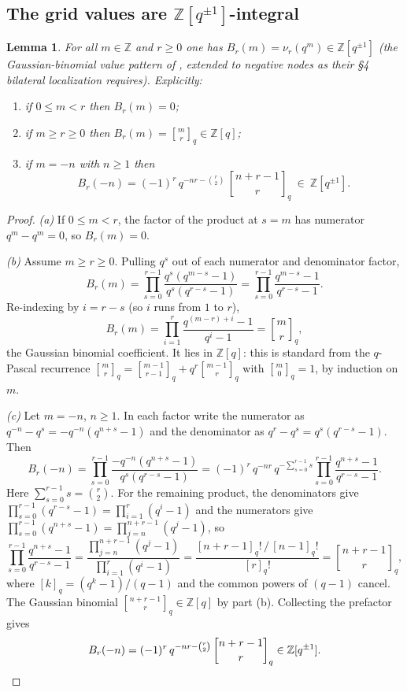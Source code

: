 \documentclass[11pt]{article}
\newtheorem{lemma}{Lemma}
\newcommand{\Z}{\mathbb Z}
\newcommand{\qbinom}[2]{\genfrac{[}{]}{0pt}{}{#1}{#2}_{q}}
\begin{document}
\subsection{The grid values are $\Z[q^{\pm1}]$-integral}

\begin{lemma}\label{lem:grid}
For all $m\in\Z$ and $r\ge0$ one has $B_r(m)=\nu_r(q^{m})\in\Z[q^{\pm1}]$
(the Gaussian-binomial value pattern of \cite[\S1]{HarmanHopkins}, extended
to negative nodes as their \S4 bilateral localization requires).
Explicitly:
\begin{enumerate}
\item[(a)] if $0\le m<r$ then $B_r(m)=0$;
\item[(b)] if $m\ge r\ge0$ then $B_r(m)=\qbinom{m}{r}\in\Z[q]$;
\item[(c)] if $m=-n$ with $n\ge1$ then
  \[
    B_r(-n)=(-1)^{r}\,q^{-nr-\binom{r}{2}}\,\qbinom{n+r-1}{r}\ \in\ \Z[q^{\pm1}].
  \]
\end{enumerate}
\end{lemma}

\begin{proof}
\emph{(a)}\; If $0\le m<r$, the factor of the product at $s=m$ has numerator
$q^{m}-q^{m}=0$, so $B_r(m)=0$.

\emph{(b)}\; Assume $m\ge r\ge0$. Pulling $q^{s}$ out of each numerator and
denominator factor,
\[
  B_r(m)=\prod_{s=0}^{r-1}\frac{q^{s}(q^{m-s}-1)}{q^{s}(q^{r-s}-1)}
        =\prod_{s=0}^{r-1}\frac{q^{m-s}-1}{q^{r-s}-1}.
\]
Re-indexing by $i=r-s$ (so $i$ runs from $1$ to $r$),
\[
  B_r(m)=\prod_{i=1}^{r}\frac{q^{(m-r)+i}-1}{q^{i}-1}=\qbinom{m}{r},
\]
the Gaussian binomial coefficient. It lies in $\Z[q]$: this is standard from the
$q$-Pascal recurrence $\qbinom{m}{r}=\qbinom{m-1}{r-1}+q^{r}\qbinom{m-1}{r}$ with
$\qbinom{m}{0}=1$, by induction on $m$.

\emph{(c)}\; Let $m=-n$, $n\ge1$. In each factor write the numerator as
$q^{-n}-q^{s}=-q^{-n}(q^{n+s}-1)$ and the denominator as
$q^{r}-q^{s}=q^{s}(q^{r-s}-1)$. Then
\[
  B_r(-n)=\prod_{s=0}^{r-1}\frac{-q^{-n}(q^{n+s}-1)}{q^{s}(q^{r-s}-1)}
        =(-1)^{r}\,q^{-nr}\,q^{-\sum_{s=0}^{r-1}s}
          \prod_{s=0}^{r-1}\frac{q^{n+s}-1}{q^{r-s}-1}.
\]
Here $\sum_{s=0}^{r-1}s=\binom{r}{2}$. For the remaining product, the
denominators give $\prod_{s=0}^{r-1}(q^{r-s}-1)=\prod_{i=1}^{r}(q^{i}-1)$ and the
numerators give $\prod_{s=0}^{r-1}(q^{n+s}-1)=\prod_{j=n}^{n+r-1}(q^{j}-1)$, so
\[
  \prod_{s=0}^{r-1}\frac{q^{n+s}-1}{q^{r-s}-1}
  =\frac{\prod_{j=n}^{n+r-1}(q^{j}-1)}{\prod_{i=1}^{r}(q^{i}-1)}
  =\frac{[n+r-1]_q!\,/\,[n-1]_q!}{[r]_q!}=\qbinom{n+r-1}{r},
\]
where $[k]_q=(q^{k}-1)/(q-1)$ and the common powers of $(q-1)$ cancel. The
Gaussian binomial $\qbinom{n+r-1}{r}\in\Z[q]$ by part (b). Collecting the
prefactor gives
\[
  B_r(-n)=(-1)^{r}\,q^{-nr-\binom{r}{2}}\,\qbinom{n+r-1}{r}\in\Z[q^{\pm1}].
  \qedhere
\]
\end{proof}
\end{document}
